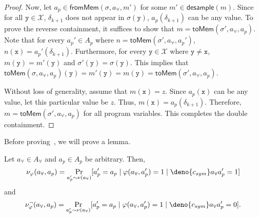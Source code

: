 \documentclass[acmsmall,review,anonymous]{acmart}\settopmatter{printfolios=true,printccs=false,printacmref=false}
\begin{document}
\begin{proof}
  Now, let $a_p \in \mathsf{fromMem}(\sigma,a_{\forall},m')$ for some $m' \in \mathsf{desample}(m)$. Since for all $\mathtt{y} \in \mathcal{X}$, $\delta_{k+1}$ does not appear in $\sigma(\mathtt{y})$, $a_p(\delta_{k+1})$ can be any value. To prove the reverse containment, it suffices to show that $m = \mathsf{toMem}(\sigma',a_{\forall},a_p)$. Note that for every $a_p' \in \mathit{A}_p$ where $n = \mathsf{toMem}(\sigma',a_{\forall},a_p')$, $n(\mathtt{x}) = a_p'(\delta_{k+1})$. Furthermore, for every $\mathtt{y} \in \mathcal{X}$ where $\mathtt{y} \neq \mathtt{x}$, $m(\mathtt{y}) = m'(\mathtt{y})$ and $\sigma'(\mathtt{y}) = \sigma(\mathtt{y})$. This implies that $\mathsf{toMem}(\sigma,a_{\forall},a_p)(\mathtt{y}) = m'(\mathtt{y}) = m(\mathtt{y}) = \mathsf{toMem}(\sigma',a_{\forall},a_p)$.

  Without loss of generality, assume that $m(\mathtt{x}) = z$. Since $a_p(\mathtt{x})$ can be any value, let this particular value be $z$. Thus, $m(\mathtt{x}) = a_p(\delta_{k+1})$. Therefore, $m = \mathsf{toMem}(\sigma',a_{\forall},a_p)$ for all program variables. This completes the double containment.
\end{proof}

\soundnessBranching*
Before proving~, we will prove a lemma.
\begin{lemma}
  \label{lem:condition}
  Let $a_{\forall} \in \mathit{A}_{\forall}$ and $a_p \in \mathit{A}_p$ be arbitrary. Then,
  \[
    \nu_{\varphi}(a_{\forall},a_p) = \Pr_{a_p' \sim \nu(a_{\forall})}[ a_p' = a_p \mid \varphi(a_{\forall},a_p') = 1 \mid \deno{c_{sym}} a_{\forall} a_p'= 1 ]
  \]
  and
  \[
    \nu_{\varphi}^{\neg}(a_{\forall},a_p) = \Pr_{a_p' \sim \nu(a_{\forall})}[ a_p' = a_p \mid \varphi(a_{\forall},a_p') = 1 \mid \deno{c_{sym}} a_{\forall} a_p' = 0 ].
  \]
\end{lemma}
\end{document}
